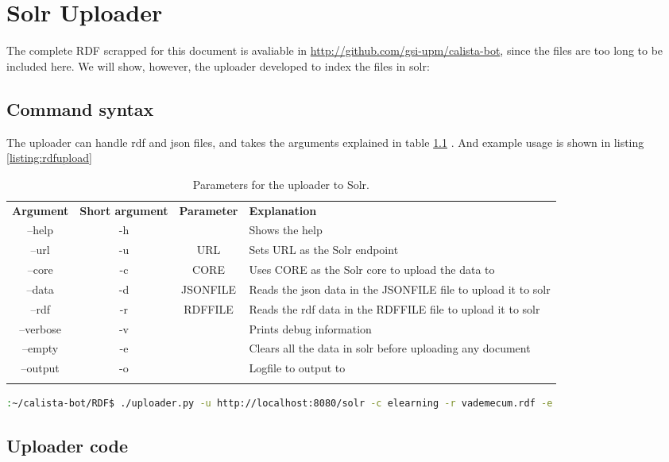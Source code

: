 \chapter{Solr Uploader}

The complete RDF scrapped for this document is avaliable in \url{http://github.com/gsi-upm/calista-bot}, since the files are too long to be included here. We will show, however, the uploader developed to index the files in solr:

\section{Command syntax}

The uploader can handle rdf and json files, and takes the arguments explained in table \ref{tab:uploaderparams} . And example usage is shown in listing \ref{listing:rdfupload}

\begin{table}
  \centering
  \begin{tabular*}{0.9\textwidth}{| c | c | c | p{} |}
    \hhline{|-|-|-|-|}
    \textbf{Argument} & \textbf{Short argument} & \textbf{Parameter}& \textbf{Explanation} \\ \hhline{|=|=|=|=|}
    --help & -h &  & Shows the help\\ \hhline{|-|-|-|-|} 
    --url & -u & URL & Sets URL as the Solr endpoint \\ \hhline{|-|-|-|-|} 
    --core & -c & CORE & Uses CORE as the Solr core to upload the data to\\ \hhline{|-|-|-|-|} 
    --data & -d & JSONFILE & Reads the json data in the JSONFILE file to upload it to solr\\ \hhline{|-|-|-|-|} 
    --rdf & -r & RDFFILE & Reads the rdf data in the RDFFILE file to upload it to solr \\ \hhline{|-|-|-|-|} 
    --verbose & -v & & Prints debug information \\ \hhline{|-|-|-|-|} 
    --empty & -e & & Clears all the data in solr before uploading any document \\ \hhline{|-|-|-|-|} 
    --output & -o & & Logfile to output to \\ \hhline{|-|-|-|-|} 
    \end{tabular*}
  \caption{Parameters for the uploader to Solr.}
  \label{tab:uploaderparams}
\end{table}


\begin{center} 
  \begin{lstlisting}[language=bash, captionpos=b, caption=Example command to upload the vademecum data into Solr, label=listing:rdfupload]
  :~/calista-bot/RDF$ ./uploader.py -u http://localhost:8080/solr -c elearning -r vademecum.rdf -e
  \end{lstlisting}
\end{center}

\section{Uploader code}

\begin{center}
  
\end{center}
